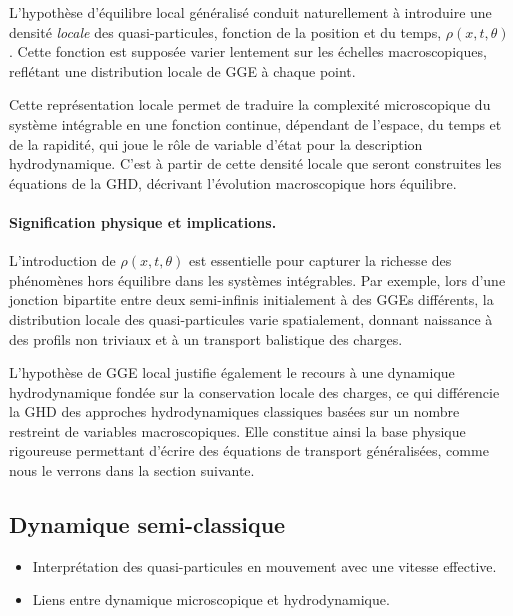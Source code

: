 L’hypothèse d’équilibre local généralisé conduit naturellement à introduire une densité \emph{locale} des quasi-particules, fonction de la position et du temps, $\rho(x,t,\theta)$. Cette fonction est supposée varier lentement sur les échelles macroscopiques, reflétant une distribution locale de GGE à chaque point. 

Cette représentation locale permet de traduire la complexité microscopique du système intégrable en une fonction continue, dépendant de l’espace, du temps et de la rapidité, qui joue le rôle de variable d’état pour la description hydrodynamique. C’est à partir de cette densité locale que seront construites les équations de la GHD, décrivant l’évolution macroscopique hors équilibre.

\paragraph{Signification physique et implications.}
L’introduction de $\rho(x,t,\theta)$ est essentielle pour capturer la richesse des phénomènes hors équilibre dans les systèmes intégrables. Par exemple, lors d’une jonction bipartite entre deux semi-infinis initialement à des GGEs différents, la distribution locale des quasi-particules varie spatialement, donnant naissance à des profils non triviaux et à un transport balistique des charges. 

L’hypothèse de GGE local justifie également le recours à une dynamique hydrodynamique fondée sur la conservation locale des charges, ce qui différencie la GHD des approches hydrodynamiques classiques basées sur un nombre restreint de variables macroscopiques. Elle constitue ainsi la base physique rigoureuse permettant d’écrire des équations de transport généralisées, comme nous le verrons dans la section suivante.


\subsection{Dynamique semi-classique}
{\color{blue}
\begin{itemize}
    \item Interprétation des quasi-particules en mouvement avec une vitesse effective.
    \item Liens entre dynamique microscopique et hydrodynamique.
\end{itemize}
}


